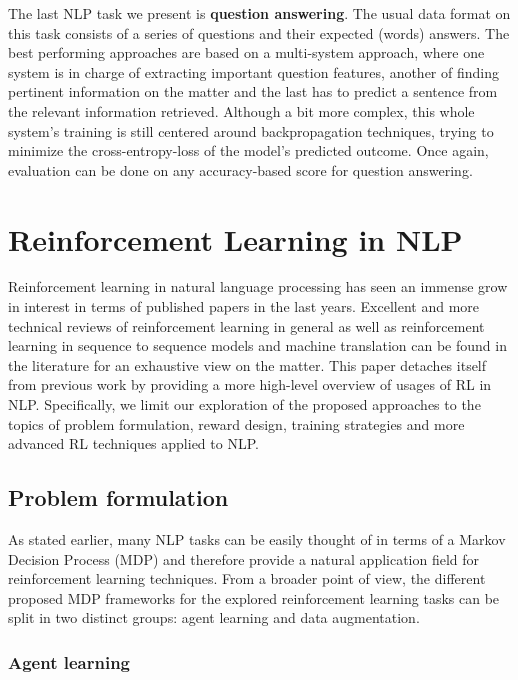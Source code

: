 \documentclass[twocolumn]{article}
\begin{document}
The last NLP task we present is \textbf{question answering}. The usual data format on this task consists of a series of questions and their expected (words) answers. The best performing approaches are based on a multi-system approach, where one system is in charge of extracting important question features, another of finding pertinent information on the matter and the last has to predict a sentence from the relevant information retrieved. Although a bit more complex, this whole system's training is still centered around backpropagation techniques, trying to minimize the cross-entropy-loss of the model's predicted outcome. Once again, evaluation can be done on any accuracy-based score for question answering. 

\section{Reinforcement Learning in NLP}

Reinforcement learning in natural language processing has seen an immense grow in interest in terms of published papers in the last years. Excellent and more technical reviews of reinforcement learning in general \citep{DBLP:journals/corr/Li17b} as well as reinforcement learning in sequence to sequence models \citep{DBLP:journals/corr/abs-1805-09461} and machine translation \citep{DBLP:journals/corr/abs-1808-08866} can be found in the literature for an exhaustive view on the matter. This paper detaches itself from previous work by providing a more high-level overview of usages of RL in NLP. Specifically, we limit our exploration of the proposed approaches to the topics of problem formulation, reward design, training strategies and more advanced RL techniques applied to NLP.

\subsection{Problem formulation}

As stated earlier, many NLP tasks can be easily thought of in terms of a Markov Decision Process (MDP) and therefore provide a natural application field for reinforcement learning techniques. From a broader point of view, the different proposed MDP frameworks for the explored reinforcement learning tasks can be split in two distinct groups: agent learning and data augmentation.

\subsubsection{Agent learning}
\end{document}
